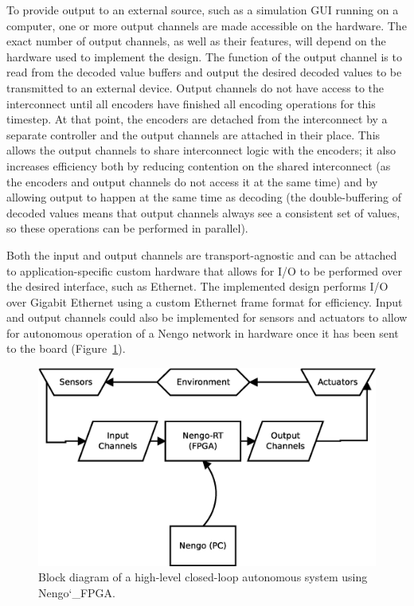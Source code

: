 \documentclass[english]{article}
\newcommand{\design}{Nengo\char`_FPGA}  %
\begin{document}
To provide output to an external source, such as a simulation GUI running on a computer, one or more output channels
are made accessible on the hardware. The exact number of output channels, as well as their features, will depend on the hardware used to implement the design.
The function of the output channel is to read from the decoded value buffers and output the desired decoded values to be transmitted
to an external device. Output channels do not have access to the interconnect until all encoders have finished all
encoding operations for this timestep. At that point, the encoders are detached from the interconnect by a separate controller and the output
channels are attached in their place. This allows the output channels to share interconnect logic with the encoders;
it also increases efficiency both by reducing contention on the shared interconnect (as the encoders and output channels
do not access it at the same time) and by allowing output to happen at the same time as decoding
(the double-buffering of decoded values means that output channels always see a consistent set of values,
so these operations can be performed in parallel).

Both the input and output channels are transport-agnostic and can be attached to application-specific custom hardware that allows for
I/O to be performed over the desired interface, such as Ethernet. The implemented design performs I/O over Gigabit Ethernet using a custom Ethernet frame format for efficiency.
Input and output channels could also be implemented for sensors and actuators to allow for autonomous operation of a Nengo network in hardware once it has been sent to the board
(Figure~\ref{fig:closedloop}).

\begin{figure}
\centering

\includegraphics[width=5.0in]{robot-closed-loop.eps}

\caption{Block diagram of a high-level closed-loop autonomous system using \design{}.}
\label{fig:closedloop}
\end{figure}
\end{document}
